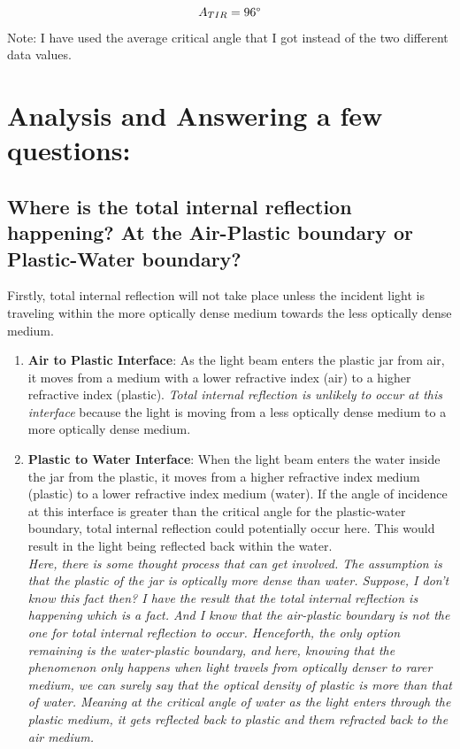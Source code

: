 \documentclass[twocolumn,11pt]{article}
\begin{document}
\begin{equation}
    \label{prism angle from light tir}
    A_{TIR} = 96\degree
\end{equation}
Note: I have used the average critical angle that I got instead of the two different data values.
\section{Analysis and Answering a few questions:}
\subsection{Where is the total internal reflection happening? At the Air-Plastic boundary or Plastic-Water boundary?}

Firstly, total internal reflection will not take place unless the incident light is traveling within the more optically dense medium towards the less optically dense medium.
\begin{enumerate}
  \item \textbf{Air to Plastic Interface}: As the light beam enters the plastic jar from air, it moves from a medium with a lower refractive index (air) to a higher refractive index (plastic). \textit{Total internal reflection is unlikely to occur at this interface} because the light is moving from a less optically dense medium to a more optically dense medium.

  \item \textbf{Plastic to Water Interface}: When the light beam enters the water inside the jar from the plastic, it moves from a higher refractive index medium (plastic) to a lower refractive index medium (water). If the angle of incidence at this interface is greater than the critical angle for the plastic-water boundary, total internal reflection could potentially occur here. This would result in the light being reflected back within the water.
  \\
  \textit{  Here, there is some thought process that can get involved. The assumption is that the plastic of the jar is optically more dense than water. Suppose, I don't know this fact then? I have the result that the total internal reflection is happening which is a fact. And I know that the air-plastic boundary is not the one for total internal reflection to occur. Henceforth, the only option remaining is the water-plastic boundary, and here, knowing that the phenomenon only happens when light travels from optically denser to rarer medium, we can surely say that the optical density of plastic is more than that of water. Meaning at the critical angle of water as the light enters through the plastic medium, it gets reflected back to plastic and them refracted back to the air medium.
}
\end{enumerate}
\end{document}
